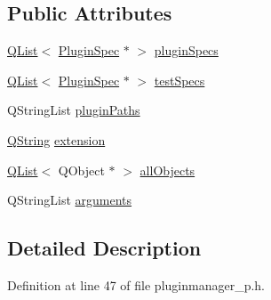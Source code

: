 \subsection*{Public Attributes}
\begin{DoxyCompactItemize}
\item 
\hyperlink{class_q_list}{Q\-List}$<$ \hyperlink{class_extension_system_1_1_plugin_spec}{Plugin\-Spec} $\ast$ $>$ \hyperlink{class_extension_system_1_1_internal_1_1_plugin_manager_private_a1654aed9c8c9d015cc3ef398f405613e}{plugin\-Specs}
\item 
\hyperlink{class_q_list}{Q\-List}$<$ \hyperlink{class_extension_system_1_1_plugin_spec}{Plugin\-Spec} $\ast$ $>$ \hyperlink{class_extension_system_1_1_internal_1_1_plugin_manager_private_a25ce55fe8bc3538c6fe2c5ac18be1f66}{test\-Specs}
\item 
Q\-String\-List \hyperlink{class_extension_system_1_1_internal_1_1_plugin_manager_private_aab8385c194dea0ca7100ace14cd9ce29}{plugin\-Paths}
\item 
\hyperlink{group___u_a_v_objects_plugin_gab9d252f49c333c94a72f97ce3105a32d}{Q\-String} \hyperlink{class_extension_system_1_1_internal_1_1_plugin_manager_private_ac92959afcbee3882ac4df6bf9d00d6b2}{extension}
\item 
\hyperlink{class_q_list}{Q\-List}$<$ Q\-Object $\ast$ $>$ \hyperlink{class_extension_system_1_1_internal_1_1_plugin_manager_private_a33d08f94e70bb4ecf53a00ed840f02a1}{all\-Objects}
\item 
Q\-String\-List \hyperlink{class_extension_system_1_1_internal_1_1_plugin_manager_private_ae4cd1bb87340f771e64431172280191c}{arguments}
\end{DoxyCompactItemize}


\subsection{Detailed Description}


Definition at line 47 of file pluginmanager\-\_\-p.\-h.



